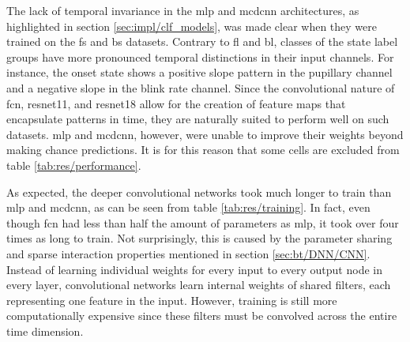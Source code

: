 
The lack of temporal invariance in the \acrshort{mlp} and \acrshort{mcdcnn} architectures, as highlighted in section \ref{sec:impl/clf_models}, was made clear when they were trained on the \acrshort{fs} and \acrshort{bs} datasets. Contrary to \acrshort{fl} and \acrshort{bl}, classes of the state label groups have more pronounced temporal distinctions in their input channels. For instance, the onset state shows a positive slope pattern in the pupillary channel and a negative slope in the blink rate channel. Since the convolutional nature of \acrshort{fcn}, \acrshort{resnet11}, and \acrshort{resnet18} allow for the creation of feature maps that encapsulate patterns in time, they are naturally suited to perform well on such datasets. \acrshort{mlp} and \acrshort{mcdcnn}, however, were unable to improve their weights beyond making chance predictions. It is for this reason that some cells are excluded from table \ref{tab:res/performance}.

As expected, the deeper convolutional networks took much longer to train than \acrshort{mlp} and \acrshort{mcdcnn}, as can be seen from table \ref{tab:res/training}. In fact, even though \acrshort{fcn} had less than half the amount of parameters as \acrshort{mlp}, it took over four times as long to train. Not surprisingly, this is caused by the parameter sharing and sparse interaction properties mentioned in section \ref{sec:bt/DNN/CNN}. Instead of learning individual weights for every input to every output node in every layer, convolutional networks learn internal weights of shared filters, each representing one feature in the input. However, training is still more computationally expensive since these filters must be convolved across the entire time dimension.

